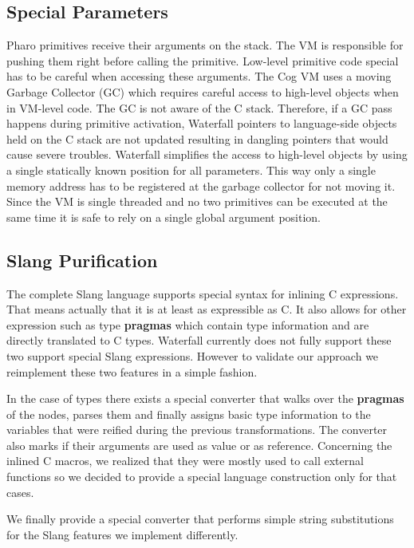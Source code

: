 \documentclass[10pt,preprint,letter]{sigplanconf}
\newcommand{\PH}  {Pharo\xspace}
\newcommand{\W}{Waterfall\xspace}
\begin{document}
\subsection{Special Parameters}
\PH primitives receive their arguments on the stack. 
The VM is responsible for pushing them right before calling the primitive.
Low-level primitive code special has to be careful when accessing these arguments.
The Cog VM uses a moving Garbage Collector (GC) which requires careful access to high-level objects when in VM-level code.
The GC is not aware of the C stack. Therefore, if a GC pass happens during primitive activation, \W pointers to language-side objects held on the C stack are not updated resulting in dangling pointers that would cause severe troubles.
\W simplifies the access to high-level objects by using a single statically known position for all parameters.
This way only a single memory address has to be registered at the garbage collector for not moving it.
Since the VM is single threaded and no two primitives can be executed at the same time it is safe to rely on a single global argument position.

\subsection{Slang Purification}
The complete Slang language supports special syntax for inlining C expressions.
That means actually that it is at least as expressible as C.
It also allows for other expression such as type \textbf{pragmas} which contain type information and are directly translated to C types. 
\W currently does not fully support these two support special Slang expressions.
However to validate our approach we reimplement these two features in a simple fashion.

In the case of types there exists a special converter that walks over the \textbf{pragmas} of the nodes, parses them and finally assigns basic type information to the variables that were reified during the previous transformations. 
The converter also marks if their arguments are used as value or as reference.
Concerning the inlined C macros, we realized that they were mostly used to call external functions so we decided to provide a special language construction only for that cases.


We finally provide a special converter that performs simple string substitutions for the Slang features we implement differently.
\end{document}
